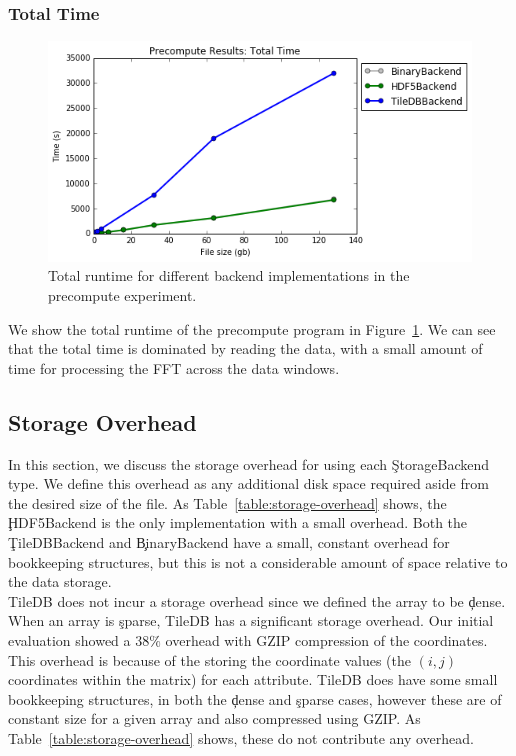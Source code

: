 \subsubsection{Total Time}

\begin{figure}[h]
\begin{center}
\includegraphics[scale=0.75]{./img/precompute-exp-total-time.png}
\caption{Total runtime for different backend implementations in the precompute
  experiment.}
\label{fig:precompute-exp-total-time}
\end{center}
\end{figure}

We show the total runtime of the precompute program in
Figure~\ref{fig:precompute-exp-total-time}. We can see that the total time is
dominated by reading the data, with a small amount of time for processing the
FFT across the data windows. \\

\subsection{Storage Overhead}

In this section, we discuss the storage overhead for using each
\c{StorageBackend} type. We define this overhead as any additional disk space
required aside from the desired size of the file. As
Table~\ref{table:storage-overhead} shows, the \c{HDF5Backend} is the only
implementation with a small overhead. Both the \c{TileDBBackend} and
\c{BinaryBackend} have a small, constant overhead for bookkeeping structures,
but this is not a considerable amount of space relative to the data storage. \\

TileDB does not incur a storage overhead since we defined the array to be
\c{dense}. When an array is \c{sparse}, TileDB has a significant storage
overhead. Our initial evaluation showed a $38\%$ overhead with GZIP compression
of the coordinates. This overhead is because of the storing the coordinate
values (the $(i,j)$ coordinates within the matrix) for each attribute. TileDB
does have some small bookkeeping structures, in both the \c{dense} and
\c{sparse} cases, however these are of constant size for a given array and also
compressed using GZIP. As Table~\ref{table:storage-overhead} shows, these do
not contribute any overhead. \\

